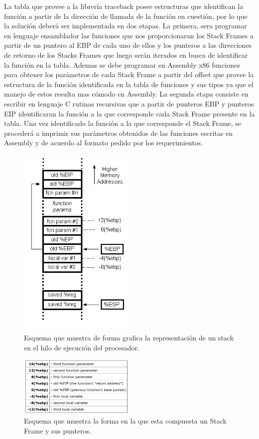 \documentclass[twocolumn,11pts]{IEEEtran}
\begin{document}
La tabla que provee a la librería traceback posee estructuras que identifican la función a partir de la dirección de llamada de la función en cuestión, por lo que la solución deberá ser implementada en dos etapas. La primera, sera programar en lenguaje ensamblador las funciones que nos proporcionaran los Stack Frames a partir de un puntero al EBP de cada uno de ellos y los punteros a las direcciones de retorno de los Stacks Frames que luego serán iterados en busca de identificar la función en la tabla. Ademas se debe programar en Assembly x86 funciones para obtener los parámetros de cada Stack Frame a partir del offset que provee la estructura de la función identificada en la tabla de funciones y sus tipos ya que el manejo de estos resulta mas cómodo en Assembly. La segunda etapa consiste en escribir en lenguaje C rutinas recursivas que a partir de punteros EBP y punteros EIP identificaran la función a la que corresponde cada Stack Frame presente en la tabla. Una vez identificado la función a la que corresponde el Stack Frame, se procederá a imprimir sus parámetros obtenidos de las funciones escritas en Assembly y de acuerdo al formato pedido por los requerimientos.\\
\begin{figure}
  \centering
    \includegraphics[width=0.5\textwidth]{imagenes/stack.png}
  \caption{Esquema que muestra de forma grafica la representación de un stack en el hilo de ejecución del procesador.}
  \label{Fig 1}
\end{figure}
\begin{figure}
  \centering
    \includegraphics[width=0.5\textwidth]{imagenes/memory.png}
  \caption{Esquema que muestra la forma en la que esta compuesta un Stack Frame y sus punteros.}
  \label{Fig 2}
\end{figure}
\end{document}
